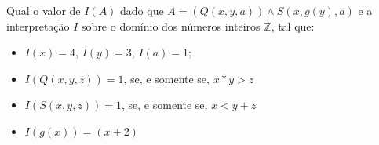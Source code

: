 
\question[10]

Qual o valor de $I(A)$ dado que $A=(Q(x, y, a)) \wedge S(x,g(y),a)$ e a interpretação $I$ sobre o domínio dos números inteiros $\mathbb{Z}$, tal que:

\begin{itemize}
	\item $I(x)= 4$, $I(y) = 3$, $I(a) = 1$;
	\item $I(Q(x, y, z)) = 1$, se, e somente se, $x*y > z$ 
	\item $I(S(x, y, z)) = 1$, se, e somente se, $x < y +z$
	\item $I(g(x)) = (x + 2)$ 
\end{itemize}

\fillin[Verdadeiro][15cm]
